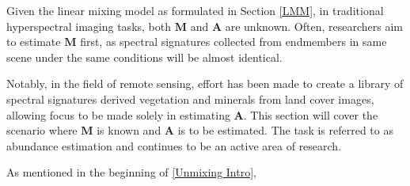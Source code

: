 Given the linear mixing model as formulated in Section \ref{LMM}, in traditional hyperspectral imaging tasks, both $\mathbf{M}$ and $\mathbf{A}$ are unknown. Often, researchers aim to estimate $\mathbf{M}$ first, as spectral signatures collected from endmembers in same scene under the same conditions will be almost identical.

Notably, in the field of remote sensing, effort has been made to create a library of spectral signatures derived vegetation and minerals from land cover images, allowing focus to be made solely in estimating $\mathbf{A}$. This section will cover the scenario where $\mathbf{M}$ is known and $\mathbf{A}$ is to be estimated. The task is referred to as abundance estimation and continues to be an active area of research.



As mentioned in the beginning of \ref{Unmixing Intro}, 